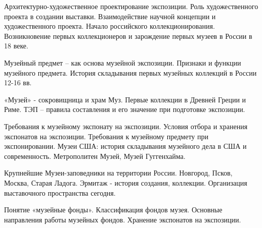 \documentclass[
	14pt,
	a4paper,
	]
	{scrartcl}
\begin{document}
\vfill

\newpage


\shapk
{}
\setcounter{zad}{0}

\vfill
\z Архитектурно-художественное проектирование экспозиции. Роль художественного проекта в создании выставки. Взаимодействие научной концепции и художественного проекта.
 \vfill
\z Начало российского коллекционирования. Возникновение первых коллекционеров и зарождение первых музеев в России в 18 веке.
 \vfill

\vfill

\newpage


\shapk
{}
\setcounter{zad}{0}

\vfill
\z Музейный предмет – как основа музейной экспозиции. Признаки и функции музейного предмета. 
 \vfill
\z История складывания первых музейных коллекций в России 12-16 вв.
 \vfill

\vfill

\newpage


\shapk
{}
\setcounter{zad}{0}

\vfill
\z «Музей» - сокровищница и храм Муз. Первые коллекции в Древней Греции и Риме. 
 \vfill
\z ТЭП – правила составления и его значение при подготовке экспозиции.
 \vfill

\vfill

\newpage


\shapk
{}
\setcounter{zad}{0}

\vfill
\z Требования к музейному экспонату на экспозиции. Условия отбора и хранения экспонатов на экспозиции.
 \vfill
\z Требования к музейному предмету при экспонировании. Музеи США: история складывания музейного дела в США и современность. Метрополитен Музей, Музей Гуггенхайма.
 \vfill

\vfill

\newpage


\shapk
{}
\setcounter{zad}{0}

\vfill
\z Крупнейшие Музеи-заповедники на территории России. Новгород, Псков, Москва, Старая Ладога.
 \vfill
\z Эрмитаж - история создания, коллекции. Организация выставочного пространства сегодня.
 \vfill

\vfill

\newpage


\shapk
{}
\setcounter{zad}{0}

\vfill
\z Понятие «музейные фонды». Классификация фондов музея. Основные направления работы музейных фондов.
 \vfill
\z Хранение экспонатов на экспозиции.
 \vfill
\end{document}

